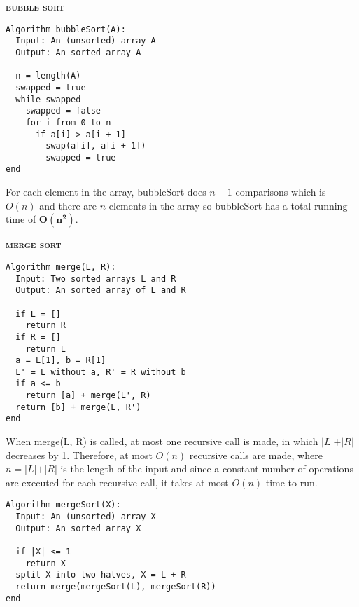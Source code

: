 \documentclass[a4paper]{article}
\begin{document}

\begin{multicols}{2}

\begin{framed}
\begin{center}
	\textbf{\textsc{bubble sort}}
\end{center}
\begin{lstlisting}
Algorithm bubbleSort(A):
  Input: An (unsorted) array A
  Output: An sorted array A
  
  n = length(A)
  swapped = true
  while swapped
    swapped = false
    for i from 0 to n
      if a[i] > a[i + 1]
      	swap(a[i], a[i + 1])
      	swapped = true
end
\end{lstlisting}

\noindent
For each element in the array, bubbleSort does $n - 1$ comparisons which is $O(n)$ and there are $n$ elements in the array so bubbleSort has a total running time of $\bm{O(n^2)}$.
\end{framed}

\begin{framed}
\begin{center}
	\textbf{\textsc{merge sort}}
\end{center}
\begin{lstlisting}
Algorithm merge(L, R):
  Input: Two sorted arrays L and R
  Output: An sorted array of L and R
  
  if L = []
    return R
  if R = []
    return L
  a = L[1], b = R[1]
  L' = L without a, R' = R without b
  if a <= b
    return [a] + merge(L', R)
  return [b] + merge(L, R')
end
\end{lstlisting}

\noindent
When merge(L, R) is called, at most one recursive call is made, in which $\vert L \vert + \vert R \vert$ decreases by 1. Therefore, at most $O(n)$ recursive calls are made, where $n = \vert L \vert + \vert R \vert $ is the length of the input and since a constant number of operations are executed for each recursive call, it takes at most $O(n)$ time to run.\\

\begin{lstlisting}
Algorithm mergeSort(X):
  Input: An (unsorted) array X
  Output: An sorted array X
  
  if |X| <= 1
    return X
  split X into two halves, X = L + R
  return merge(mergeSort(L), mergeSort(R))
end
\end{lstlisting}


\end{framed}
\end{multicols}
\end{document}
